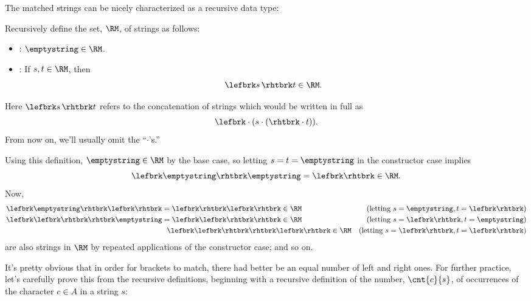 The matched strings can be nicely characterized as a recursive data type:

\begin{definition}\label{RM_def}\label{RM-def}
Recursively define the set, $\RM$, of strings as follows:
\begin{itemize}

\item {}: $\emptystring \in\RM$.

\item {}: If $s,t \in\RM$, then
\[
\lefbrk s\, \rhtbrk t \in \RM.
\]
\end{itemize}

\end{definition}

Here $\lefbrk s\, \rhtbrk t$ refers to the concatenation of
strings which would be written in full as
\[
\lefbrk \cdot (s \cdot (\rhtbrk \cdot t)).
\]
From now on, we'll usually omit the ``$\cdot$'s.'' 

Using this definition, $\emptystring \in\RM$ by the base
case, so letting $s=t =\emptystring$ in the constructor case implies
\[
\lefbrk\emptystring\rhtbrk\emptystring=\lefbrk\rhtbrk\in\RM.
\]
Now,
\begin{align*}
\lefbrk\emptystring\rhtbrk\lefbrk\rhtbrk &= \lefbrk\rhtbrk\lefbrk\rhtbrk \in \RM
    & \text{(letting $s = \emptystring, t = \lefbrk\rhtbrk$)}\\
\lefbrk\lefbrk\rhtbrk\rhtbrk\emptystring & = \lefbrk\lefbrk\rhtbrk\rhtbrk \in \RM
    & \text{(letting $s = \lefbrk\rhtbrk, t = \emptystring$)}\\
&\ \ \lefbrk\lefbrk\rhtbrk\rhtbrk\lefbrk\rhtbrk \in \RM
    & \text{(letting $s = \lefbrk\rhtbrk, t = \lefbrk\rhtbrk$)}
\end{align*}
are also strings in $\RM$ by repeated applications of the constructor
case; and so on.

\iffalse
If you haven't seen this kind of definition before, you should
try continuing this example to verify that
$\lefbrk\lefbrk\lefbrk\rhtbrk\rhtbrk\lefbrk\rhtbrk\rhtbrk\lefbrk\rhtbrk
\in \RM$.
\fi


\iffalse
Given the way this section is set up you might guess that $\RM = \GC$,
and you'd be right, but it's not completely obvious.  The proof is worked
out in Problem~\ref{PS_bracket_good_count}.
\fi

It's pretty obvious that in order for brackets to match, there had
better be an equal number of left and right ones.  For further
practice, let's carefully prove this from the recursive definitions,
beginning with a recursive definition of the number, $\cnt{c}{s}$, of
occurrences of the character $c \in A$ in a string $s$:

